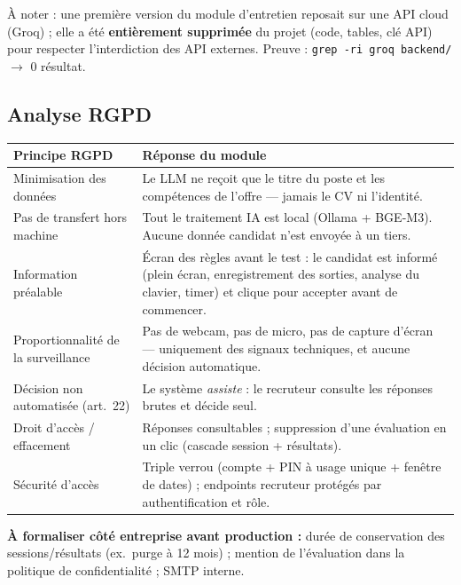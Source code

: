 \documentclass[11pt,a4paper]{article}
\begin{document}
À noter : une première version du module d'entretien reposait sur une API cloud (Groq) ;
elle a été \textbf{entièrement supprimée} du projet (code, tables, clé API) pour
respecter l'interdiction des API externes. Preuve : \texttt{grep -ri groq backend/}
$\rightarrow$ 0 résultat.

\subsection{Analyse RGPD}
\begin{center}
\begin{tabularx}{\textwidth}{p{4.6cm}X}
\toprule
\textbf{Principe RGPD} & \textbf{Réponse du module} \\
\midrule
Minimisation des données & Le LLM ne reçoit que le titre du poste et les compétences de
l'offre --- jamais le CV ni l'identité. \\
Pas de transfert hors machine & Tout le traitement IA est local (Ollama + BGE-M3).
Aucune donnée candidat n'est envoyée à un tiers. \\
Information préalable & Écran des règles avant le test : le candidat est informé
(plein écran, enregistrement des sorties, analyse du clavier, timer) et clique pour
accepter avant de commencer. \\
Proportionnalité de la surveillance & Pas de webcam, pas de micro, pas de capture
d'écran --- uniquement des signaux techniques, et aucune décision automatique. \\
Décision non automatisée (art.~22) & Le système \emph{assiste} : le recruteur consulte
les réponses brutes et décide seul. \\
Droit d'accès / effacement & Réponses consultables ; suppression d'une évaluation en un
clic (cascade session + résultats). \\
Sécurité d'accès & Triple verrou (compte + PIN à usage unique + fenêtre de dates) ;
endpoints recruteur protégés par authentification et rôle. \\
\bottomrule
\end{tabularx}
\end{center}

\noindent\textbf{À formaliser côté entreprise avant production :} durée de conservation
des sessions/résultats (ex.\ purge à 12 mois) ; mention de l'évaluation dans la
politique de confidentialité ; SMTP interne.
\end{document}
